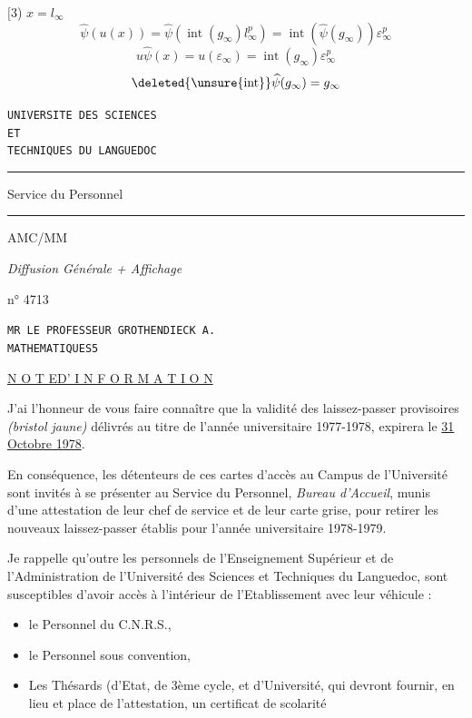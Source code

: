 $\bigl[$3) \quad $x=l_\infty$
\[
\widehat{\psi}(u(x))
=\widehat{\psi}(\operatorname{int}(g_\infty)l_\infty^p)
=\operatorname{int}(\widehat{\psi}(g_\infty))\varepsilon_\infty^p
\]
\[
u\widehat{\psi}(x)=u(\varepsilon_\infty)
=\operatorname{int}(g_\infty)\varepsilon_\infty^p
\]
\[
\deleted{\unsure{\operatorname{int}}}\widehat{\psi}(g_\infty)=g_\infty
\]


\begin{flushleft}
\texttt{UNIVERSITE DES SCIENCES}\\
\texttt{ET}\\
\texttt{TECHNIQUES DU LANGUEDOC}

\rule{3cm}{.3pt}

Service du Personnel

\rule{1cm}{.3pt}

AMC/MM

\textit{Diffusion Générale + Affichage}

n° 4713
\end{flushleft}

\begin{flushright}
\texttt{MR LE PROFESSEUR GROTHENDIECK A.}\\
\texttt{MATHEMATIQUES}\qquad\texttt{5}
\end{flushright}

\begin{center}
\uline{N O T E\qquad D' I N F O R M A T I O N}
\end{center}

J'ai l'honneur de vous faire connaître que la validité des laissez-passer provisoires \textit{(bristol jaune)} délivrés au titre de l'année universitaire 1977-1978, expirera le \uline{31 Octobre 1978}.

En conséquence, les détenteurs de ces cartes d'accès au Campus de l'Université sont invités à se présenter au Service du Personnel, \textit{Bureau d'Accueil}, munis d'une attestation de leur chef de service et de leur carte grise, pour retirer les nouveaux laissez-passer établis pour l'année universitaire 1978-1979.

Je rappelle qu'outre les personnels de l'Enseignement Supérieur et de l'Administration de l'Université des Sciences et Techniques du Languedoc, sont susceptibles d'avoir accès à l'intérieur de l'Etablissement avec leur véhicule :

\begin{itemize}
\item[-] le Personnel du C.N.R.S.,
\item[-] le Personnel sous convention,
\item[-] Les Thésards (d'Etat, de 3ème cycle, et d'Université, qui devront fournir, en lieu et place de l'attestation, un certificat de scolarité
\end{itemize}

